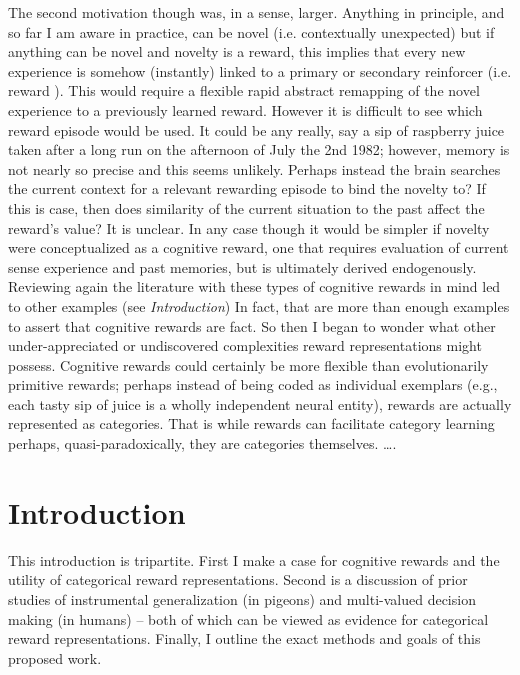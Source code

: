 \documentclass[doc,12pt]{apa}        %
\begin{document}
The second motivation though was, in a sense, larger.  Anything in principle, and so far I am aware in practice, can be novel (i.e. contextually unexpected) but if anything can be novel and novelty is a reward, this implies that every new experience is somehow (instantly) linked to a primary or secondary reinforcer (i.e. reward ).  This would require a flexible rapid abstract remapping of the novel experience to a previously learned reward.  However it is difficult to see which reward episode would be used.  It could be any really, say a sip of raspberry juice taken after a long run on the afternoon of July the 2nd 1982; however, memory is not nearly so precise and this seems unlikely.  Perhaps instead the brain searches the current context for a relevant rewarding episode to bind the novelty to?  If this is case, then does similarity of the current situation to the past affect the reward's value?  It is unclear.  In any case though it would be simpler if novelty were conceptualized as a cognitive reward, one that requires evaluation of current sense experience and past memories, but is ultimately derived endogenously.  Reviewing again the literature with these types of cognitive rewards in mind led to other examples (see \emph{Introduction})  In fact, that are more than enough examples to assert that cognitive rewards are fact.  So then I began to wonder what other under-appreciated or undiscovered complexities reward representations might possess.  Cognitive rewards could certainly be more flexible than evolutionarily primitive rewards; perhaps instead of being coded as individual exemplars (e.g., each tasty sip of juice is a wholly independent neural entity), rewards are actually represented as categories.  That is while rewards can facilitate category learning perhaps, quasi-paradoxically, they are categories themselves. \ldots.

\section{Introduction} %
\label{sec:introduction}
This introduction is tripartite.  First I make a case for cognitive rewards and the utility of categorical reward representations.  Second is a discussion of prior studies of instrumental generalization (in pigeons) and multi-valued decision making (in humans) -- both of which can be viewed as evidence for categorical reward representations.  Finally, I outline the exact methods and goals of this proposed work.
\end{document}
